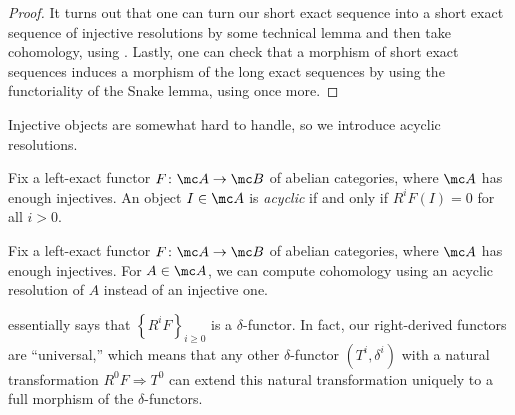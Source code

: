\documentclass[../notes.tex]{subfiles}
\begin{document}
\begin{proof}
	It turns out that one can turn our short exact sequence into a short exact sequence of injective resolutions by some technical lemma and then take cohomology, using . Lastly, one can check that a morphism of short exact sequences induces a morphism of the long exact sequences by using the functoriality of the Snake lemma, using  once more.
\end{proof}
Injective objects are somewhat hard to handle, so we introduce acyclic resolutions.
\begin{definition}[acyclic]
	Fix a left-exact functor $F\colon\mc A\to\mc B$ of abelian categories, where $\mc A$ has enough injectives. An object $I\in\mc A$ is \textit{acyclic} if and only if $R^iF(I)=0$ for all $i>0$.
\end{definition}
\begin{proposition} \label{prop:acyclic-res}
	Fix a left-exact functor $F\colon\mc A\to\mc B$ of abelian categories, where $\mc A$ has enough injectives. For $A\in\mc A$, we can compute cohomology using an acyclic resolution of $A$ instead of an injective one.
\end{proposition}
\begin{remark}
	 essentially says that $\left\{R^iF\right\}_{i\ge0}$ is a $\delta$-functor. In fact, our right-derived functors are ``universal,'' which means that any other $\delta$-functor $\left(T^i,\delta^i\right)$ with a natural transformation $R^0F\Rightarrow T^0$ can extend this natural transformation uniquely to a full morphism of the $\delta$-functors.
\end{remark}
\end{document}
